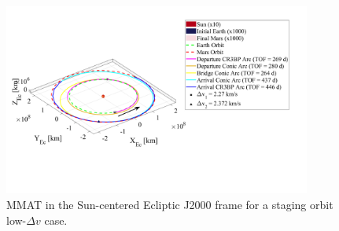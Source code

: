 \begin{figure}[H]
    \centering
    \includegraphics[width=0.9\textwidth]{figures/StagedMinDvMMAT.pdf}
    \caption{MMAT in the Sun-centered Ecliptic J2000 frame for a staging orbit low-$\Delta v$ case.}
    \label{fig:stagedMinDvMMAT}
\end{figure}
\vspace{20mm}

